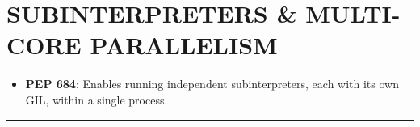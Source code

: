 \hypertarget{subinterpreters-multi-core-parallelism}{%
\chapter{SUBINTERPRETERS \& MULTI-CORE
PARALLELISM}\label{subinterpreters-multi-core-parallelism}}

\begin{itemize}
\tightlist
\item
  \textbf{PEP 684}: Enables running independent subinterpreters, each
  with its own GIL, within a single process.
\end{itemize}

\begin{center}\rule{0.5\linewidth}{0.5pt}\end{center}
